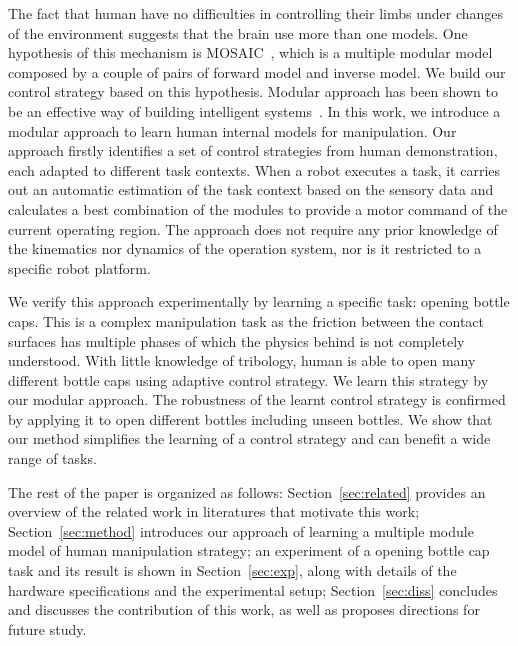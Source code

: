 The fact that human have no difficulties in controlling their limbs under changes of the environment suggests that the brain use more than one models. One hypothesis of this mechanism is MOSAIC~\cite{haruno2001mosaic}, which is a multiple modular model composed by a couple of pairs of forward model and inverse model. We build our control strategy based on this hypothesis. Modular approach has been shown to be an effective way of building intelligent systems~\cite{bryson2004modular,BrysonMcG12}. In this work, we introduce a modular approach to learn human internal models for manipulation. Our approach firstly identifies a set of control strategies from human demonstration, each adapted to different task contexts. When a robot executes a task, it carries out an automatic estimation of the task context based on the sensory data and calculates a best combination of the modules to provide a motor command of the current operating region. The approach does not require any prior knowledge of the kinematics nor dynamics of the operation system, nor is it restricted to a specific robot platform. %

We verify this approach experimentally by learning a specific task: opening bottle caps. This is a complex manipulation task as the friction between the contact surfaces has multiple phases of which the physics behind is not completely understood. With little knowledge of tribology, human is able to open many different bottle caps using adaptive control strategy. We learn this strategy by our modular approach. The robustness of the learnt control strategy is confirmed by applying it to open different bottles including unseen bottles. We show that our method simplifies the learning of a control strategy and can benefit a wide range of tasks.


The rest of the paper is organized as follows: Section~\ref{sec:related} provides an overview of the related work in literatures that motivate this work; Section~\ref{sec:method} introduces our approach of learning a multiple module model of human manipulation strategy; an experiment of a opening bottle cap task and its result is shown in Section~\ref{sec:exp}, along with details of the hardware specifications and the experimental setup; Section~\ref{sec:diss} concludes and discusses the contribution of this work, as well as proposes directions for future study. 